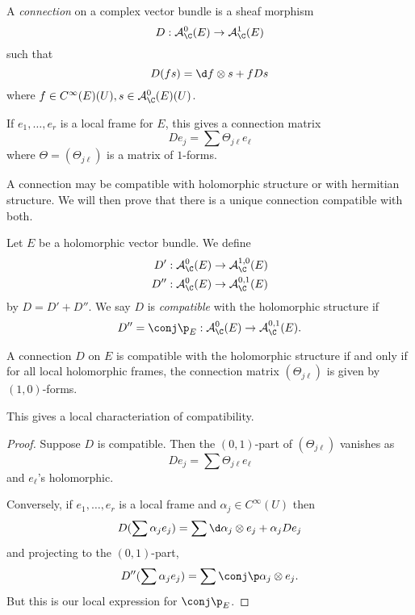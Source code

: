 \documentclass[a4paper]{article}
\begin{document}
\begin{definition}[connection]
  A \emph{connection} on a complex vector bundle is a sheaf morphism
  \[
    D: \mathcal A_\C^0(E) \to \mathcal A_\C^1(E)
  \]
  such that
  \[
    D(fs) = \d f \otimes s + f Ds
  \]
  where \(f \in C^\infty(E)(U), s \in \mathcal A_\C^0(E)(U)\).
\end{definition}
If \(e_1, \dots, e_r\) is a local frame for \(E\), this gives a connection matrix
\[
  D e_j = \sum \Theta_{j\ell} e_\ell
\]
where \(\Theta = (\Theta_{j\ell})\) is a matrix of \(1\)-forms.

A connection may be compatible with holomorphic structure or with hermitian structure. We will then prove that there is a unique connection compatible with both.

\begin{definition}
  Let \(E\) be a holomorphic vector bundle. We define
  \begin{align*}
    D': \mathcal A_\C^0(E) &\to \mathcal A_\C^{1, 0}(E) \\
    D'': \mathcal A_\C^0(E) &\to \mathcal A_\C^{0, 1}(E)
  \end{align*}
  by \(D = D' + D''\). We say \(D\) is \emph{compatible} with the holomorphic structure if
  \[
    D'' = \conj \p_E: \mathcal A_\C^0(E) \to \mathcal A_\C^{0, 1}(E).
  \]
\end{definition}

\begin{proposition}
  A connection \(D\) on \(E\) is compatible with the holomorphic structure if and only if for all local holomorphic frames, the connection matrix \((\Theta_{j\ell})\) is given by \((1, 0)\)-forms.
\end{proposition}
This gives a local characteriation of compatibility.

\begin{proof}
  Suppose \(D\) is compatible. Then the \((0, 1)\)-part of \((\Theta_{j\ell})\) vanishes as
  \[
    D e_j = \sum \Theta_{j\ell} e_\ell
  \]
  and \(e_\ell\)'s holomorphic.

  Conversely, if \(e_1, \dots, e_r\) is a local frame and \(\alpha_j \in C^\infty(U)\) then
  \[
    D(\sum \alpha_j e_j) = \sum \d \alpha_j \otimes e_j + \alpha_j D e_j
  \]
  and projecting to the \((0, 1)\)-part,
  \[
    D''(\sum \alpha_j e_j) = \sum \conj \p \alpha_j \otimes e_j.
  \]
  But this is our local expression for \(\conj \p_E\).
\end{proof}
\end{document}

